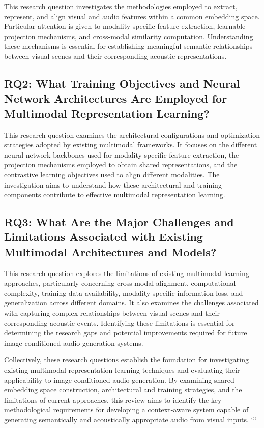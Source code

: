 \documentclass[pdflatex,sn-mathphys-num]{sn-jnl}%
\theoremstyle{thmstyleone}%
\theoremstyle{thmstyletwo}%
\theoremstyle{thmstylethree}%
\begin{document}
This research question investigates the methodologies employed to extract, represent, and align visual and audio features within a common embedding space. Particular attention is given to modality-specific feature extraction, learnable projection mechanisms, and cross-modal similarity computation. Understanding these mechanisms is essential for establishing meaningful semantic relationships between visual scenes and their corresponding acoustic representations.

\subsection{RQ2: What Training Objectives and Neural Network Architectures Are Employed for Multimodal Representation Learning?}

This research question examines the architectural configurations and optimization strategies adopted by existing multimodal frameworks. It focuses on the different neural network backbones used for modality-specific feature extraction, the projection mechanisms employed to obtain shared representations, and the contrastive learning objectives used to align different modalities. The investigation aims to understand how these architectural and training components contribute to effective multimodal representation learning.

\subsection{RQ3: What Are the Major Challenges and Limitations Associated with Existing Multimodal Architectures and Models?}

This research question explores the limitations of existing multimodal learning approaches, particularly concerning cross-modal alignment, computational complexity, training data availability, modality-specific information loss, and generalization across different domains. It also examines the challenges associated with capturing complex relationships between visual scenes and their corresponding acoustic events. Identifying these limitations is essential for determining the research gaps and potential improvements required for future image-conditioned audio generation systems.

Collectively, these research questions establish the foundation for investigating existing multimodal representation learning techniques and evaluating their applicability to image-conditioned audio generation. By examining shared embedding space construction, architectural and training strategies, and the limitations of current approaches, this review aims to identify the key methodological requirements for developing a context-aware system capable of generating semantically and acoustically appropriate audio from visual inputs.
```
\end{document}
